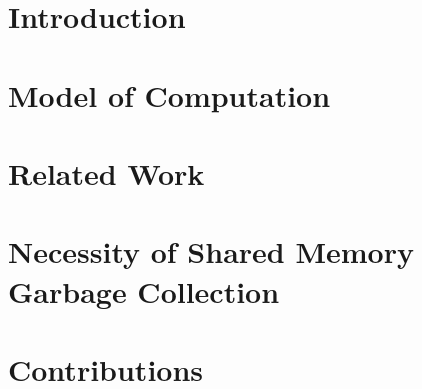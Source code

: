 \section{Introduction}
\section{Model of Computation}
\section{Related Work}
\section{Necessity of Shared Memory Garbage Collection}
\section{Contributions}